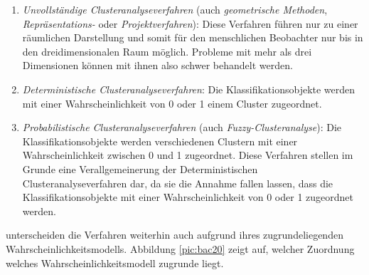 \begin{enumerate}
	\item \textit{Unvollständige Clusteranalyseverfahren} (auch \textit{geometrische Methoden}, \textit{Repräsentations-} oder \textit{Projektverfahren}): Diese Verfahren führen nur zu einer räumlichen Darstellung und somit für den menschlichen Beobachter nur bis in den dreidimensionalen Raum möglich. Probleme mit mehr als drei Dimensionen können mit ihnen also schwer behandelt werden.
	\item \textit{Deterministische Clusteranalyseverfahren}: Die Klassifikationsobjekte werden mit einer Wahrscheinlichkeit von 0 oder 1 einem Cluster zugeordnet. 
	\item \textit{Probabilistische Clusteranalyseverfahren} (auch \textit{Fuzzy-Clusteranalyse}): Die Klassifikationsobjekte werden verschiedenen Clustern mit einer Wahrscheinlichkeit zwischen 0 und 1 zugeordnet. Diese Verfahren stellen im Grunde eine Verallgemeinerung der Deterministischen Clusteranalyseverfahren dar, da sie die Annahme fallen lassen, dass die Klassifikationsobjekte mit einer Wahrscheinlichkeit von 0 oder 1 zugeordnet werden.
\end{enumerate}

\citet[S. 21]{Bacher.2010} unterscheiden die Verfahren weiterhin auch aufgrund ihres zugrundeliegenden Wahrscheinlichkeitsmodells. Abbildung \ref{pic:bac20} zeigt auf, welcher Zuordnung welches Wahrscheinlichkeitsmodell zugrunde liegt. 